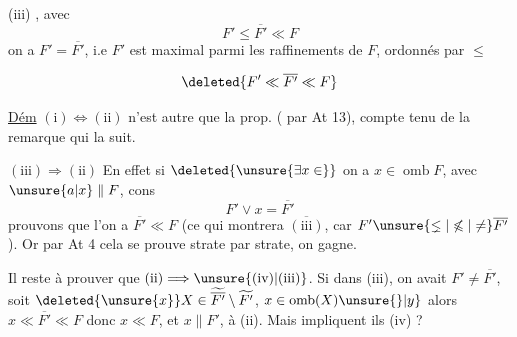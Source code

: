 (iii)  , avec
\[
F'\leqslant\overline{F'}\ll F
\]
on a $F'=\overline{F'}$, i.e $F'$ est maximal parmi les raffinements de $F$, ordonnés par $\leqslant$

\[
\deleted{F'\ll\overline{F'}\ll F}
\]

\uline{Dém} \quad $\mathrm{(i)}\Longleftrightarrow\mathrm{(ii)}$ n'est autre que la prop. ( par At 13), compte tenu de la remarque qui la suit.


$\mathrm{(iii)}\Longrightarrow\mathrm{(ii)}$   En effet si $\deleted{\unsure{\exists x\in}}$ on a $x\in\operatorname{omb} F$, avec $\unsure{a|x}\parallel F$, cons
\[
F'\vee x=\overline{F'}
\]
prouvons que l'on a $\overline{F'}\ll F$ (ce qui montrera $\overline{\mathrm{(iii)}}$, car $F'\unsure{\lneq|\not\leqslant|\neq}\overline{F'}$). Or  par At 4 cela se prouve strate par strate, on gagne.


Il reste à prouver que $\mathrm{(ii)}\Longrightarrow\unsure{\mathrm{(iv)}|\mathrm{(iii)}}$.  Si dans (iii), on avait $F'\neq\overline{F'}$, soit $\deleted{\unsure{x}}X\in\widetilde{\overline{F'}}\setminus\widetilde{F'}$, $x\in\operatorname{omb}(X)\unsure{\}|y}$ alors $x\ll\overline{F'}\ll F$ donc $x\ll F$, et $x\parallel F'$,  à (ii).  Mais impliquent ils (iv) ?
